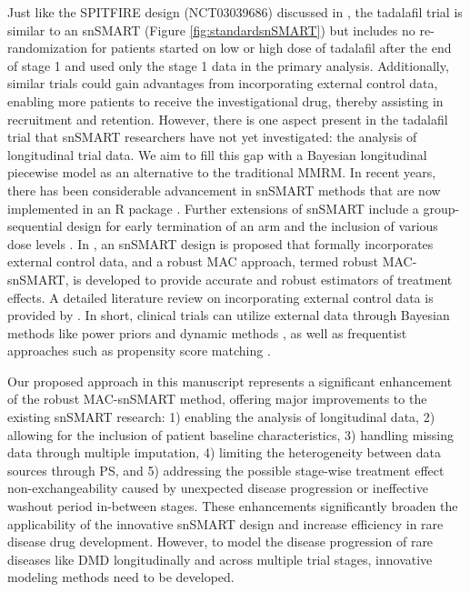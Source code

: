 Just like the SPITFIRE design (NCT03039686) discussed in \cite{wang2023dynamic}, the tadalafil trial is similar to an \ac{snSMART} \citep{tamura2016small} (Figure \ref{fig:standardsnSMART}) but includes no re-randomization for patients started on low or high dose of tadalafil after the end of stage 1 and used only the stage 1 data in the primary analysis. Additionally, similar trials could gain advantages from incorporating external control data, enabling more patients to receive the investigational drug, thereby assisting in recruitment and retention. However, there is one aspect present in the tadalafil trial that \ac{snSMART} researchers have not yet investigated: the analysis of longitudinal trial data. We aim to fill this gap with a Bayesian longitudinal piecewise model as an alternative to the traditional MMRM. In recent years, there has been considerable advancement in \ac{snSMART} methods \citep{wei2018bayesian, wei2020sample, hartman2021design} that are now implemented in an R package \citep{sidisnSMART}. Further extensions of \ac{snSMART} include a group-sequential design for early termination of an arm \citep{chao2020bayesian} and the inclusion of various dose levels \citep{fang2021bayesian, fang2023comparing}. In \cite{wang2023dynamic}, an \ac{snSMART} design is proposed that formally incorporates external control data, and a robust \ac{MAC} approach, termed robust MAC-snSMART, is developed to provide accurate and robust estimators of treatment effects. A detailed literature review on incorporating external control data is provided by \cite{wang2023dynamic}. In short, clinical trials can utilize external data through Bayesian methods like power priors \citep{ibrahim2000power} and dynamic methods \citep{duan2005modified, neuenschwander2009note, neuenschwander2010summarizing, neuenschwander2016use, hobbs2011hierarchical, schmidli2014robust}, as well as frequentist approaches such as propensity score matching \citep{rosenbaum1983central, lin2018propensity}. 

Our proposed approach in this manuscript represents a significant enhancement of the robust MAC-snSMART method, offering major improvements to the existing \ac{snSMART} research: 1) enabling the analysis of longitudinal data, 2) allowing for the inclusion of patient baseline characteristics, 3) handling missing data through multiple imputation, 4) limiting the heterogeneity between data sources through \ac{PS}, and 5) addressing the possible stage-wise treatment effect non-exchangeability caused by unexpected disease progression or ineffective washout period in-between stages. These enhancements significantly broaden the applicability of the innovative \ac{snSMART} design and increase efficiency in rare disease drug development. However, to model the disease progression of rare diseases like \ac{DMD} longitudinally and across multiple trial stages, innovative modeling methods need to be developed.

